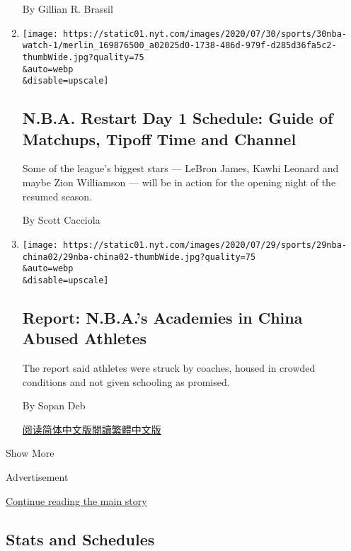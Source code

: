 \begin{enumerate}
  By Gillian R. Brassil
\item
  \href{/2020/07/30/sports/basketball/nba-schedule.html}{}

  \texttt{[image: https://static01.nyt.com/images/2020/07/30/sports/30nba-watch-1/merlin\_169876500\_a02025d0-1738-486d-979f-d285d36fa5c2-thumbWide.jpg?quality=75\\\&auto=webp\\\&disable=upscale]}

  \hypertarget{nba-restart-day-1-schedule-guide-of-matchups-tipoff-time-and-channel}{%
  \subsection{N.B.A. Restart Day 1 Schedule: Guide of Matchups, Tipoff
  Time and
  Channel}\label{nba-restart-day-1-schedule-guide-of-matchups-tipoff-time-and-channel}}

  Some of the league's biggest stars --- LeBron James, Kawhi Leonard and
  maybe Zion Williamson --- will be in action for the opening night of
  the resumed season.

  By Scott Cacciola
\item
  \href{/2020/07/29/sports/basketball/nba-china-abuse.html}{}

  \texttt{[image: https://static01.nyt.com/images/2020/07/29/sports/29nba-china02/29nba-china02-thumbWide.jpg?quality=75\\\&auto=webp\\\&disable=upscale]}

  \hypertarget{report-nbas-academies-in-china-abused-athletes}{%
  \subsection{Report: N.B.A.'s Academies in China Abused
  Athletes}\label{report-nbas-academies-in-china-abused-athletes}}

  The report said athletes were struck by coaches, housed in crowded
  conditions and not given schooling as promised.

  By Sopan Deb

  \href{https://cn.nytimes.com/sports/20200730/nba-china-abuse/}{阅读简体中文版}\href{https://cn.nytimes.com/sports/20200730/nba-china-abuse/zh-hant/}{閱讀繁體中文版}
\end{enumerate}

Show More

Advertisement

\protect\hyperlink{after-mid1}{Continue reading the main story}

\hypertarget{stats-and-schedules}{%
\subsection{Stats and Schedules}\label{stats-and-schedules}}

